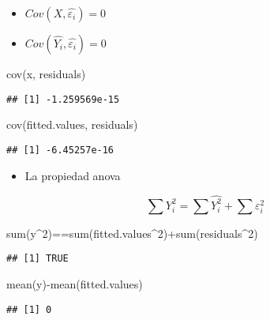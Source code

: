 \documentclass[
  ignorenonframetext,
]{beamer}
\newenvironment{Shaded}{\begin{snugshade}}{\end{snugshade}}
\newcommand{\DecValTok}[1]{\textcolor[rgb]{0.00,0.00,0.81}{#1}}
\newcommand{\FunctionTok}[1]{\textcolor[rgb]{0.00,0.00,0.00}{#1}}
\newcommand{\NormalTok}[1]{#1}
\newcommand{\SpecialCharTok}[1]{\textcolor[rgb]{0.00,0.00,0.00}{#1}}
\providecommand{\tightlist}{%
  \setlength{\itemsep}{0pt}\setlength{\parskip}{0pt}}
\begin{document}
\begin{frame}[fragile]{}
\protect\hypertarget{section-10}{}
\begin{itemize}
\tightlist
\item
  \(Cov(X,\hat{\varepsilon_i})=0\)
\item
  \(Cov(\hat{Y_i},\hat{\varepsilon_i})=0\)
\end{itemize}

\begin{Shaded}
\begin{Highlighting}[]
\FunctionTok{cov}\NormalTok{(x, residuals)}
\end{Highlighting}
\end{Shaded}

\begin{verbatim}
## [1] -1.259569e-15
\end{verbatim}

\begin{Shaded}
\begin{Highlighting}[]
\FunctionTok{cov}\NormalTok{(fitted.values, residuals)}
\end{Highlighting}
\end{Shaded}

\begin{verbatim}
## [1] -6.45257e-16
\end{verbatim}
\end{frame}

\begin{frame}[fragile]{}
\protect\hypertarget{section-11}{}
\begin{itemize}
\tightlist
\item
  La propiedad anova
\end{itemize}

\[\sum Y_i^2=\sum\hat{Y_i^2}+ \sum \hat{\varepsilon_i^2}\]

\begin{Shaded}
\begin{Highlighting}[]
\FunctionTok{sum}\NormalTok{(y}\SpecialCharTok{\^{}}\DecValTok{2}\NormalTok{)}\SpecialCharTok{==}\FunctionTok{sum}\NormalTok{(fitted.values}\SpecialCharTok{\^{}}\DecValTok{2}\NormalTok{)}\SpecialCharTok{+}\FunctionTok{sum}\NormalTok{(residuals}\SpecialCharTok{\^{}}\DecValTok{2}\NormalTok{)}
\end{Highlighting}
\end{Shaded}

\begin{verbatim}
## [1] TRUE
\end{verbatim}

\begin{Shaded}
\begin{Highlighting}[]
\FunctionTok{mean}\NormalTok{(y)}\SpecialCharTok{{-}}\FunctionTok{mean}\NormalTok{(fitted.values)}
\end{Highlighting}
\end{Shaded}

\begin{verbatim}
## [1] 0
\end{verbatim}
\end{frame}
\end{document}
